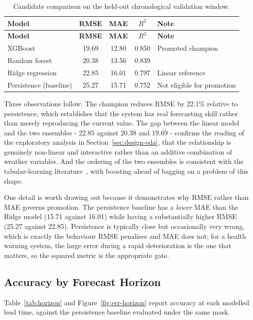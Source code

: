 \begin{xltabular}{\textwidth}{P{5.0cm} C C C Y}
\caption{Candidate comparison on the held-out chronological validation
window.}\label{tab:candidates}\\
\toprule
\bfseries Model & \bfseries RMSE & \bfseries MAE & \bfseries $R^2$ & \bfseries Note \\
\midrule
\endfirsthead
\toprule
\bfseries Model & \bfseries RMSE & \bfseries MAE & \bfseries $R^2$ & \bfseries Note \\
\midrule
\endhead
\bottomrule
\endlastfoot
XGBoost & 19.69 & 12.80 & 0.850 & Promoted champion \\
Random forest & 20.38 & 13.56 & 0.839 & \\
Ridge regression & 22.85 & 16.01 & 0.797 & Linear reference \\
Persistence (baseline) & 25.27 & 15.71 & 0.752 & Not eligible for promotion \\
\end{xltabular}

Three observations follow. The champion reduces RMSE by 22.1\% relative to
persistence, which establishes that the system has real forecasting skill rather
than merely reproducing the current value. The gap between the linear model and
the two ensembles - 22.85 against 20.38 and 19.69 - confirms the reading of the
exploratory analysis in Section~\ref{sec:design-eda}, that the relationship is
genuinely non-linear and interactive rather than an additive combination of
weather variables. And the ordering of the two ensembles is consistent with the
tabular-learning literature~\cite{ref:whytrees}, with boosting ahead of bagging on
a problem of this shape.

One detail is worth drawing out because it demonstrates why RMSE rather than MAE
governs promotion. The persistence baseline has a \emph{lower} MAE than the Ridge
model (15.71 against 16.01) while having a substantially higher RMSE (25.27
against 22.85). Persistence is typically close but occasionally very wrong, which
is exactly the behaviour RMSE penalises and MAE does not; for a health warning
system, the large error during a rapid deterioration is the one that matters, so
the squared metric is the appropriate gate.

\subsection{Accuracy by Forecast Horizon}
Table~\ref{tab:horizon} and Figure~\ref{fig:err-horizon} report accuracy at each
modelled lead time, against the persistence baseline evaluated under the same
mask.

